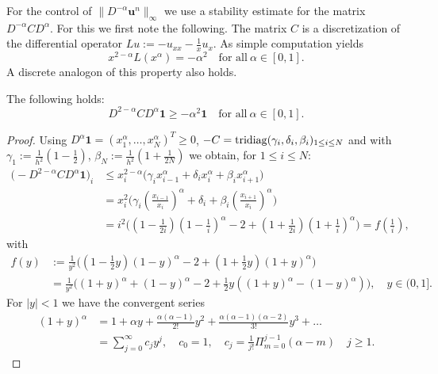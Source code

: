 \documentclass{siamltex}
\newcommand{\bu}{\mathbf u}
\newcommand{\bfone}{\mathbf{1}}
\begin{document}
{For the  control of $\|D^{-\alpha}\bu^n\|_\infty$ we use a stability estimate for the matrix $D^{-\alpha}C D^\alpha$. For this we first note the following. The matrix $C$ is a discretization of the differential operator $Lu:=-u_{xx}-\tfrac{1}{x}u_x$. As simple computation yields
\begin{equation} \label{s1}
   x^{2-\alpha}L(x^\alpha)= - \alpha^2 \quad \text{for all}~ \alpha \in [0,1].
\end{equation}
A discrete analogon of this property also holds.
\begin{lemma} \label{lemA}
The following holds:
\[
   D^{2-\alpha}C D^\alpha \bfone \geq - \alpha^2 \bfone \quad \text{for all}~ \alpha \in [0,1].
\]
\end{lemma}
\begin{proof} 
Using $D^\alpha\bfone= (x_1^\alpha, \ldots,x_N^\alpha)^T \geq 0$,  $-C = {\rm tridiag}(\gamma_i,\delta_i,\beta_i)_{1 \leq i \leq N}$ and with $\gamma_1:= \frac{1}{h^2}(1-\frac{1}{2})$, $\beta_N:= \frac{1}{h^2} (1 +\frac{1}{2N})$ we obtain, for $1 \leq i \leq N$:
\begin{equation} \label{E4} \begin{split}
 \big(-D^{2-\alpha}C D^\alpha \bfone\big)_i & \leq x_i^{2-\alpha}\big(\gamma_i x_{i-1}^\alpha +\delta_i x_i^\alpha + \beta_i x_{i+1}^\alpha \big) \\
   & = x_i^{2}\big(\gamma_i (\frac{x_{i-1}}{x_i})^\alpha +\delta_i  + \beta_i (\frac{x_{i+1}}{x_i})^\alpha \big)\\
   & = i^2 \big( (1-\tfrac{1}{2i})(1- \tfrac{1}{i})^\alpha -2 +(1+\tfrac{1}{2i})(1+\tfrac{1}{i})^\alpha\big) =f(\tfrac{1}{i}),
  \end{split}
\end{equation}
with 
\begin{equation} \label{deff} \begin{split}
 f(y) & := \tfrac{1}{y^2}\big( (1- \tfrac12 y)(1-y)^\alpha -2 + (1+\tfrac12 y)(1+y)^\alpha\big) \\
    & = \tfrac{1}{y^2}\big((1+y)^\alpha +(1-y)^\alpha -2 + \tfrac12 y ((1+y)^\alpha -(1-y)^\alpha)\big), \quad y \in (0,1].  
\end{split} \end{equation}
For $|y| < 1$ we have the convergent series
\begin{align*}
  (1+y)^\alpha & = 1+\alpha y + \frac{\alpha(\alpha-1)}{2!} y^2 + \frac{\alpha(\alpha-1)(\alpha-2)}{3!} y^3 + \ldots  \\
    & = \sum_{j=0}^\infty c_j y^j, \quad c_0=1, \quad c_j=\tfrac{1}{j!} \Pi_{m=0}^{j-1} (\alpha -m) \quad j \geq 1.

\end{align*}
\end{proof}}
\end{document}
